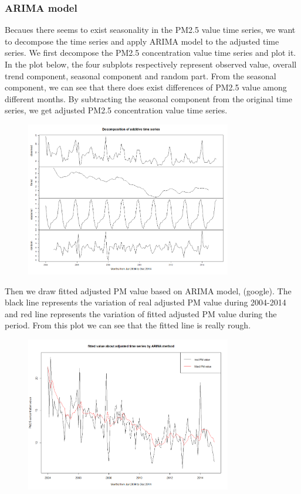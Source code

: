 \subsubsection{ARIMA model}
Becaues there seems to exist seasonality in the PM2.5 value time series, we want to decompose the time series and apply ARIMA model to the adjusted time series. We first decompose the PM2.5 concentration value time series and plot it. In the plot below, the four subplots respectively represent observed value, overall trend component, seasonal component and random part. From the seasonal component, we can see that there does exist differences of PM2.5 value among different months. By subtracting the seasonal component from the original time series, we get adjusted PM2.5 concentration value time series.

\begin{figure}[ht!]
\centering
\includegraphics[width = 90mm]{ts4.png}
\end{figure}

Then we draw fitted adjusted PM value based on ARIMA model, (google). The black line represents the variation of real adjusted PM value during 2004-2014  and red line represents the variation of fitted adjusted PM value during the period. From this plot we can see that the fitted line is really rough.

\begin{figure}[ht!]
\centering
\includegraphics[width = 90mm]{ts5.png}
\end{figure}

